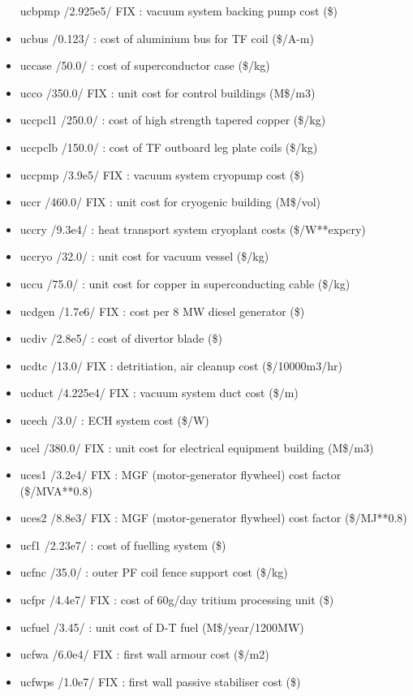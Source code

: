 \documentclass[]{article}
\begin{document}
\begin{itemize}
  ucbpmp /2.925e5/ FIX : vacuum system backing pump cost (\$)
\item
  ucbus /0.123/ : cost of aluminium bus for TF coil (\$/A-m)
\item
  uccase /50.0/ : cost of superconductor case (\$/kg)
\item
  ucco /350.0/ FIX : unit cost for control buildings (M\$/m3)
\item
  uccpcl1 /250.0/ : cost of high strength tapered copper (\$/kg)
\item
  uccpclb /150.0/ : cost of TF outboard leg plate coils (\$/kg)
\item
  uccpmp /3.9e5/ FIX : vacuum system cryopump cost (\$)
\item
  uccr /460.0/ FIX : unit cost for cryogenic building (M\$/vol)
\item
  uccry /9.3e4/ : heat transport system cryoplant costs (\$/W**expcry)
\item
  uccryo /32.0/ : unit cost for vacuum vessel (\$/kg)
\item
  uccu /75.0/ : unit cost for copper in superconducting cable (\$/kg)
\item
  ucdgen /1.7e6/ FIX : cost per 8 MW diesel generator (\$)
\item
  ucdiv /2.8e5/ : cost of divertor blade (\$)
\item
  ucdtc /13.0/ FIX : detritiation, air cleanup cost (\$/10000m3/hr)
\item
  ucduct /4.225e4/ FIX : vacuum system duct cost (\$/m)
\item
  ucech /3.0/ : ECH system cost (\$/W)
\item
  ucel /380.0/ FIX : unit cost for electrical equipment building
  (M\$/m3)
\item
  uces1 /3.2e4/ FIX : MGF (motor-generator flywheel) cost factor
  (\$/MVA**0.8)
\item
  uces2 /8.8e3/ FIX : MGF (motor-generator flywheel) cost factor
  (\$/MJ**0.8)
\item
  ucf1 /2.23e7/ : cost of fuelling system (\$)
\item
  ucfnc /35.0/ : outer PF coil fence support cost (\$/kg)
\item
  ucfpr /4.4e7/ FIX : cost of 60g/day tritium processing unit (\$)
\item
  ucfuel /3.45/ : unit cost of D-T fuel (M\$/year/1200MW)
\item
  ucfwa /6.0e4/ FIX : first wall armour cost (\$/m2)
\item
  ucfwps /1.0e7/ FIX : first wall passive stabiliser cost (\$)

\end{itemize}
\end{document}
